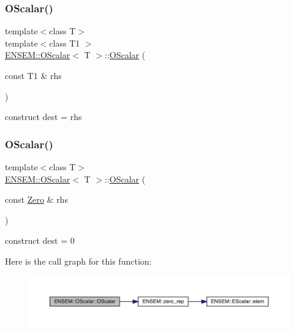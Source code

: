 \subsubsection{\texorpdfstring{OScalar()}{OScalar()}\hspace{0.1cm}{\footnotesize\ttfamily [10/12]}}
{\footnotesize\ttfamily template$<$class T$>$ \\
template$<$class T1 $>$ \\
\mbox{\hyperlink{classENSEM_1_1OScalar}{E\+N\+S\+E\+M\+::\+O\+Scalar}}$<$ T $>$\+::\mbox{\hyperlink{classENSEM_1_1OScalar}{O\+Scalar}} (\begin{DoxyParamCaption}\item[{const T1 \&}]{rhs }\end{DoxyParamCaption})\hspace{0.3cm}{\ttfamily [inline]}}



construct dest = rhs 

\mbox{\label{classENSEM_1_1OScalar_a9bc3830b1a4af2e67da73871396ae06c}} 
\subsubsection{\texorpdfstring{OScalar()}{OScalar()}\hspace{0.1cm}{\footnotesize\ttfamily [11/12]}}
{\footnotesize\ttfamily template$<$class T$>$ \\
\mbox{\hyperlink{classENSEM_1_1OScalar}{E\+N\+S\+E\+M\+::\+O\+Scalar}}$<$ T $>$\+::\mbox{\hyperlink{classENSEM_1_1OScalar}{O\+Scalar}} (\begin{DoxyParamCaption}\item[{const \mbox{\hyperlink{structENSEM_1_1Zero}{Zero}} \&}]{rhs }\end{DoxyParamCaption})\hspace{0.3cm}{\ttfamily [inline]}}



construct dest = 0 

Here is the call graph for this function\+:
\nopagebreak
\begin{figure}[H]
\begin{center}
\leavevmode
\includegraphics[width=350pt]{da/d80/classENSEM_1_1OScalar_a9bc3830b1a4af2e67da73871396ae06c_cgraph}
\end{center}
\end{figure}
\mbox{\label{classENSEM_1_1OScalar_a4e394f0291247b014b9b75354e79ae6a}} 
